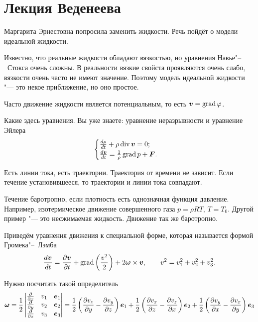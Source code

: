 \section{Лекция Веденеева}

Маргарита Эрнестовна попросила заменить жидкости. Речь пойдёт о модели идеальной жидкости.

Известно, что реальные жидкости обладают вязкостью, но уравнения Навье"--~Стокса очень сложны. В реальности вязкие свойста проявляются очень слабо, вязкости очень часто не имеют значение. Поэтому модель идеальной жидкости "--- это некое приближение, но оно простое.

Часто движение жидкости является потенциальным, то есть $\boldsymbol{v} = \operatorname{grad} \varphi$.

Какие здесь уравнения. Вы уже знаете: уравнение неразрывности и уравнение Эйлера
\begin{equation}\label{eq1}
  \begin{cases}
\frac{d\rho}{d t} +\rho\operatorname{div}\boldsymbol{v} = 0;\\
\frac{d\boldsymbol{v}}{dt} = \-\frac1\rho\operatorname{grad} p+\boldsymbol{F}.
\end{cases}
\end{equation}

Есть линии тока, есть траектории. Траектория от времени не зависит. Если течение установившееся, то траектории и линии тока совпадают.

Течение баротропно, если плотность есть однозначная функция давление. Например, изотермическое движение совершенного газа $p=\rho R T$, $T=T_0$. Другой пример "--- это несжимаемая жидкость. Движение так же баротропно.

Приведём уравнения движения к специальной форме, которая называется формой Громека"--~Лэмба
\begin{equation}
\label{eq2}
\frac{d\boldsymbol{v}}{d t} = \frac{\partial \boldsymbol{v}}{\partial t}+\operatorname{grad}\left(\frac{ v^2}2\right) + 2\boldsymbol{\omega}\times \boldsymbol{v},\qquad v^2 = v_1^2+v_2^2+v_3^2.
\end{equation}

Нужно посчитать такой определитель
\[\boldsymbol{\omega} = \frac12
\begin{vmatrix}
\frac{\partial }{\partial x}&v_1&\boldsymbol{e}_1\\
\frac{\partial }{\partial y}&v_2&\boldsymbol{e}_2\\
\frac{\partial }{\partial z}&v_3&\boldsymbol{e}_3\\
\end{vmatrix}
=\frac12\left(\frac{\partial v_z}{\partial y}-\frac{\partial v_y}{\partial z}\right)\boldsymbol{e}_1
+\frac12\left(\frac{\partial v_x}{\partial z}-\frac{\partial v_z}{\partial x}\right)\boldsymbol{e}_2
+\frac12\left(\frac{\partial v_y}{\partial x}-\frac{\partial v_x}{\partial y}\right)\boldsymbol{e}_3
\]

